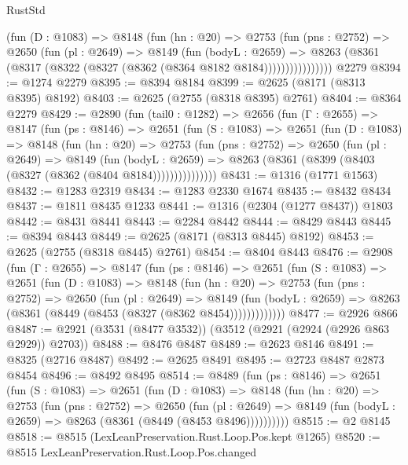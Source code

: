 \begin{lexlean}{RustStd}
\begin{coremodule}
              (fun (D : @1083) =>
              @8148
                (fun (hn : @20) =>
                @2753
                  (fun (pns : @2752) =>
                  @2650
                    (fun (pl : @2649) =>
                    @8149
                      (fun (bodyL : @2659) =>
                      @8263 (@8361 (@8317 (@8322 (@8327 (@8362 (@8364 @8182 @8184))))))))))))))))
    @2279
@8394 := @1274 @2279
@8395 := @8394 @8184
@8399 := @2625 (@8171 (@8313 @8395) @8192)
@8403 := @2625 (@2755 (@8318 @8395) @2761)
@8404 := @8364 @2279
@8429 := @2890
    (fun (tail0 : @1282) =>
    @2656
      (fun (Γ : @2655) =>
      @8147
        (fun (ps : @8146) =>
        @2651
          (fun (S : @1083) =>
          @2651
            (fun (D : @1083) =>
            @8148
              (fun (hn : @20) =>
              @2753
                (fun (pns : @2752) =>
                @2650
                  (fun (pl : @2649) =>
                  @8149
                    (fun (bodyL : @2659) =>
                    @8263 (@8361 (@8399 (@8403 (@8327 (@8362 (@8404 @8184)))))))))))))))
@8431 := @1316 (@1771 @1563)
@8432 := @1283 @2319
@8434 := @1283 @2330 @1674
@8435 := @8432 @8434
@8437 := @1811 @8435 @1233
@8441 := @1316 (@2304 (@1277 @8437)) @1803
@8442 := @8431 @8441
@8443 := @2284 @8442
@8444 := @8429 @8443
@8445 := @8394 @8443
@8449 := @2625 (@8171 (@8313 @8445) @8192)
@8453 := @2625 (@2755 (@8318 @8445) @2761)
@8454 := @8404 @8443
@8476 := @2908
    (fun (Γ : @2655) =>
    @8147
      (fun (ps : @8146) =>
      @2651
        (fun (S : @1083) =>
        @2651
          (fun (D : @1083) =>
          @8148
            (fun (hn : @20) =>
            @2753
              (fun (pns : @2752) =>
              @2650
                (fun (pl : @2649) =>
                @8149
                  (fun (bodyL : @2659) =>
                  @8263 (@8361 (@8449 (@8453 (@8327 (@8362 @8454)))))))))))))
@8477 := @2926 @866
@8487 := @2921 (@3531 (@8477 @3532)) (@3512 (@2921 (@2924 (@2926 @863 @2929)) @2703))
@8488 := @8476 @8487
@8489 := @2623 @8146
@8491 := @8325 (@2716 @8487)
@8492 := @2625 @8491
@8495 := @2723 @8487 @2873 @8454
@8496 := @8492 @8495
@8514 := @8489
    (fun (ps : @8146) =>
    @2651
      (fun (S : @1083) =>
      @2651
        (fun (D : @1083) =>
        @8148
          (fun (hn : @20) =>
          @2753
            (fun (pns : @2752) =>
            @2650
              (fun (pl : @2649) =>
              @8149 (fun (bodyL : @2659) => @8263 (@8361 (@8449 (@8453 @8496))))))))))
@8515 := @2 @8145
@8518 := @8515 (LexLeanPreservation.Rust.Loop.Pos.kept @1265)
@8520 := @8515 LexLeanPreservation.Rust.Loop.Pos.changed

\end{coremodule}
\end{lexlean}
